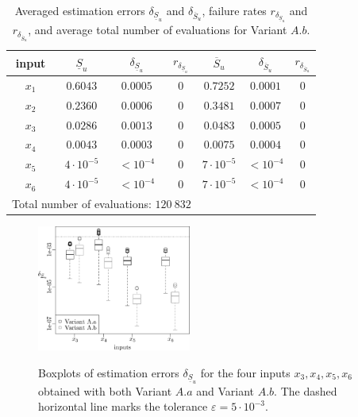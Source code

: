 \begin{table}[t]
\caption{Averaged estimation errors $\delta_{\underline{S}_u}$  and $\delta_{\overline{S}_u}$, failure rates $r_{\delta_{\underline{S}_u}}$ and $r_{\delta_{\overline{S}_u}}$, and average total number of evaluations for Variant $A.b$.}
\centering
\begin{tabular}{ccccccc}
\hline
 input & $\underline{S}_u$ & $\delta_{\underline{S}_u}$ & $r_{\delta_{\underline{S}_u}}$ & $\overline{S}_u$ & $\delta_{\overline{S}_u}$ &$r_{\delta_{\overline{S}_u}}$ \\ \hline
 $x_1$ & $0.6043$ &  $0.0005$ & $0$ & $0.7252$ & $0.0001$ & $0$ \\ \hline
 $x_2$ & $0.2360$ &  $0.0006$ & $0$ & $0.3481$ & $0.0007$ & $0$ \\ \hline
 $x_3$ & $0.0286$ &  $0.0013$ & $0$ & $0.0483$ & $0.0005$ & $0$ \\ \hline
 $x_4$ & $0.0043$ &  $0.0003$ & $0$ & $0.0075$ & $0.0004$ & $0$ \\ \hline
 $x_5$ & $4\cdot 10^{-5}$ & $< 10^{-4}$ & $0$ & $7\cdot 10^{-5}$ & $< 10^{-4}$ & $0$ \\ \hline
 $x_6$ & $4\cdot 10^{-5}$ & $< 10^{-4}$ & $0$  & $7\cdot 10^{-5}$ & $< 10^{-4}$ & $0$ \\ \hline \hline
\multicolumn{4}{l}{Total number of evaluations: $120 \ 832$} & & &\\ \hline 
\end{tabular}
\label{res.gfunc.Ab}
\end{table}
\begin{figure}[t]
\caption{Boxplots of estimation errors $\delta_{\underline{S}_u}$ for the four inputs $x_3,x_4,x_5,x_6$ obtained with both Variant $A.a$ and Variant $A.b$. The dashed horizontal line marks the tolerance $\varepsilon=5\cdot 10^{-3}$.}
\vspace*{0.2cm}
\centering
\includegraphics[width=0.45\textwidth]{Fig2.eps}
\label{boxplots.gfunc}
\end{figure}

